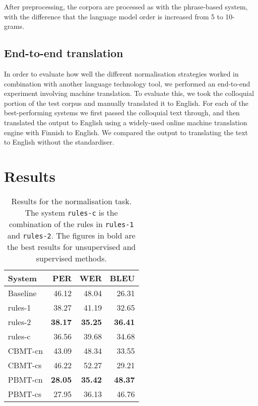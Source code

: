 \documentclass[11pt]{article}
\begin{document}
After preprocessing, the corpora are processed as with the phrase-based system, with the difference that the language model order is increased from 5 to 10-grams.

\subsection{End-to-end translation}

In order to evaluate how well the different normalisation strategies worked in 
combination with another language technology tool, we performed an end-to-end experiment
involving machine translation.
To evaluate this, we took the colloquial portion of the test corpus and manually 
translated it to English. For each of the best-performing systems we first passed
the colloquial text through, and then translated the output to English using
a widely-used online machine translation engine with Finnish to English. We compared
the output to translating the text to English without the standardiser. 

\section{Results}

\begin{table}
  \centering
  \begin{tabular}{|l|r|r|r|}
     \hline
    \textbf{System} & \textbf{PER} & \textbf{WER} & \textbf{BLEU} \\
     \hline
     Baseline & 46.12 & 48.04 & 26.31 \\
     \hline
     rules-1 & 38.27 & 41.19 & 32.65 \\
     rules-2 & \textbf{38.17} & \textbf{35.25} & \textbf{36.41} \\
     rules-c & 36.56 & 39.68 & 34.68 \\
     \hline
     CBMT-cn & 43.09 & 48.34 & 33.55 \\
     CBMT-cs & 46.22 & 52.27 & 29.21 \\
     PBMT-cn & \textbf{28.05} & \textbf{35.42} & \textbf{48.37} \\
     PBMT-cs & 27.95 & 36.13 & 46.76 \\
     \hline
  \end{tabular}
  \caption{Results for the normalisation task. The system \texttt{rules-c} is the combination
     of the rules in \texttt{rules-1} and \texttt{rules-2}. The figures in bold are the 
     best results for unsupervised and supervised methods.}
  \label{table:results-norm}
\end{table}
\end{document}
